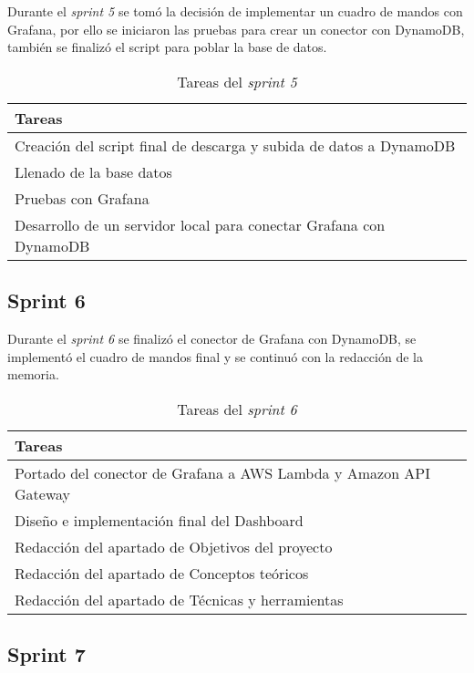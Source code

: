 Durante el \textit{sprint 5} se tomó la decisión de implementar un cuadro de mandos con Grafana, por ello se iniciaron las pruebas para crear un conector con DynamoDB, también se finalizó el script para poblar la base de datos.

\begin{table}[H]
    \centering
    \begin{tabular}{l}
    \hline
    \textbf{Tareas} \\ \hline
    Creación del script final de descarga y subida de datos a DynamoDB \\
    Llenado de la base datos \\
    Pruebas con Grafana \\
    Desarrollo de un servidor local para conectar Grafana con DynamoDB \\ \hline
    \end{tabular}
    \caption{Tareas del \textit{sprint 5}}
    \label{tab:tasks_sprint5}
\end{table}

\subsection{Sprint 6}

Durante el \textit{sprint 6} se finalizó el conector de Grafana con DynamoDB, se implementó el cuadro de mandos final y se continuó con la redacción de la memoria.

\begin{table}[H]
    \centering
    \begin{tabular}{l}
    \hline
    \textbf{Tareas} \\ \hline
    Portado del conector de Grafana a AWS Lambda y Amazon API Gateway \\
    Diseño e implementación final del Dashboard \\
    Redacción del apartado de Objetivos del proyecto \\
    Redacción del apartado de Conceptos teóricos \\
    Redacción del apartado de Técnicas y herramientas \\ \hline
    \end{tabular}
    \caption{Tareas del \textit{sprint 6}}
    \label{tab:tasks_sprint6}
\end{table}

\subsection{Sprint 7}

